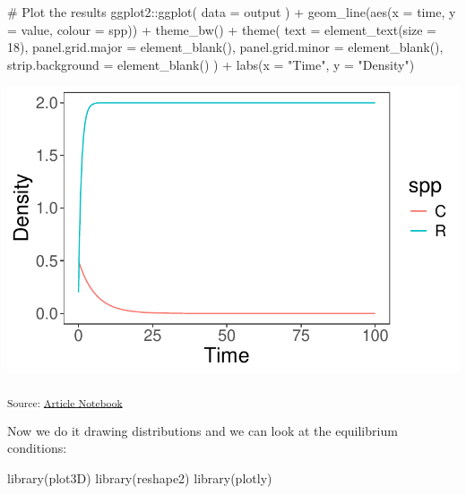 \documentclass[
  letterpaper,
  DIV=11,
  numbers=noendperiod]{scrartcl}
\newenvironment{Shaded}{\begin{snugshade}}{\end{snugshade}}
\newcommand{\AttributeTok}[1]{\textcolor[rgb]{0.40,0.45,0.13}{#1}}
\newcommand{\CommentTok}[1]{\textcolor[rgb]{0.37,0.37,0.37}{#1}}
\newcommand{\DecValTok}[1]{\textcolor[rgb]{0.68,0.00,0.00}{#1}}
\newcommand{\FunctionTok}[1]{\textcolor[rgb]{0.28,0.35,0.67}{#1}}
\newcommand{\NormalTok}[1]{\textcolor[rgb]{0.00,0.23,0.31}{#1}}
\newcommand{\SpecialCharTok}[1]{\textcolor[rgb]{0.37,0.37,0.37}{#1}}
\newcommand{\StringTok}[1]{\textcolor[rgb]{0.13,0.47,0.30}{#1}}
\begin{document}
\begin{Shaded}
\begin{Highlighting}[]
\CommentTok{\# Plot the results}
\NormalTok{ggplot2}\SpecialCharTok{::}\FunctionTok{ggplot}\NormalTok{(}
    \AttributeTok{data =}\NormalTok{ output}
\NormalTok{) }\SpecialCharTok{+}
    \FunctionTok{geom\_line}\NormalTok{(}\FunctionTok{aes}\NormalTok{(}\AttributeTok{x =}\NormalTok{ time, }\AttributeTok{y =}\NormalTok{ value, }\AttributeTok{colour =}\NormalTok{ spp)) }\SpecialCharTok{+}
    \FunctionTok{theme\_bw}\NormalTok{() }\SpecialCharTok{+}
    \FunctionTok{theme}\NormalTok{(}
        \AttributeTok{text =} \FunctionTok{element\_text}\NormalTok{(}\AttributeTok{size =} \DecValTok{18}\NormalTok{),}
        \AttributeTok{panel.grid.major =} \FunctionTok{element\_blank}\NormalTok{(),}
        \AttributeTok{panel.grid.minor =} \FunctionTok{element\_blank}\NormalTok{(),}
        \AttributeTok{strip.background =} \FunctionTok{element\_blank}\NormalTok{()}
\NormalTok{    ) }\SpecialCharTok{+}
    \FunctionTok{labs}\NormalTok{(}\AttributeTok{x =} \StringTok{"Time"}\NormalTok{, }\AttributeTok{y =} \StringTok{"Density"}\NormalTok{)}
\end{Highlighting}
\end{Shaded}

\includegraphics{index_files/figure-pdf/unnamed-chunk-1-1.pdf}

\textsubscript{Source:
\href{https://colebrookson.github.io/theRmal-landscape/index.qmd.html}{Article
Notebook}}

Now we do it drawing distributions and we can look at the equilibrium
conditions:

\begin{Shaded}
\begin{Highlighting}[]
\FunctionTok{library}\NormalTok{(plot3D)}
\FunctionTok{library}\NormalTok{(reshape2)}
\FunctionTok{library}\NormalTok{(plotly)}
\end{Highlighting}
\end{Shaded}
\end{document}
